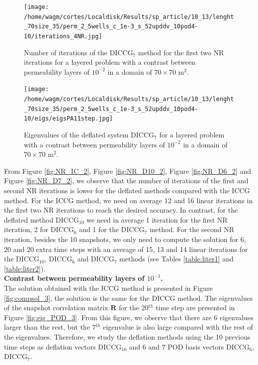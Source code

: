 \documentclass[12pt]{article}
\begin{document}
\begin{figure}[!h]
\centering
\begin{minipage}{.4\textwidth}
\vspace{-0.4cm}
\hspace{-1cm}
\texttt{[image: /home/wagm/cortes/Localdisk/Results/sp\_article/10\_13/lenght\_70size\_35/perm\_2\_5wells\_c\_1e-3\_s\_52upddv\_10pod4-10/iterations\_4NR.jpg]}
\vspace{-1.3cm}
\caption{Number of iterations of the DICCG$_7$ method for the first two NR iterations for a layered problem with a contrast between permeability layers of $10^{-2}$ in a domain of $70 \times 70$ m$^2$.}
\label{fig:NR_D7_2}
\end{minipage}%
\hspace{15mm}
\begin{minipage}{.4\textwidth}
 \centering
\texttt{[image: /home/wagm/cortes/Localdisk/Results/sp\_article/10\_13/lenght\_70size\_35/perm\_2\_5wells\_c\_1e-3\_s\_52upddv\_10pod4-10/eigs/eigsPA11step.jpg]}
\caption{Eigenvalues of the deflated system DICCG$_7$ for a layered problem with a contrast between permeability layers of $10^{-2}$ in a domain of $70 \times 70$ m$^2$.}
\label{fig:eigs_PA7_2}
\end{minipage}
\end{figure}
\newpage

From Figure \ref{fig:NR_IC_2},  Figure \ref{fig:NR_D10_2}, Figure \ref{fig:NR_D6_2} and Figure \ref{fig:NR_D7_2}, we observe that the number of iterations of the first and second NR iterations is lower for the deflated methods compared with the ICCG method. For the ICCG method, we need on average 12 and 16 linear iterations in the first two NR iterations to reach the desired accuracy. In contrast, for the deflated method DICCG$_{10}$ we need in average 1 iteration for the first NR iteration, 2 for DICCG$_6$ and 1 for the DICCG$_7$ method. For the second NR iteration, besides the 10 snapshots, we only need to compute the solution for 6, 20 and 20 extra time steps with an average of 15, 13 and 14 linear iterations for the DICCG$_{10}$, DICCG$_6$ and DICCG$_7$ methods (see Tables \ref{table:liter1} and \ref{table:liter2}). \\

\newpage
\textbf{Contrast between permeability layers of $10^{-3}$.}\\
The solution obtained with the ICCG method is presented in Figure \ref{fig:compsol_3}, the solution is the same for the DICCG method. The eigenvalues of the snapshot correlation matrix $\mathbf{R}$ for the 20$^{th}$ time step are presented in Figure \ref{fig:eig_POD_3}. From this figure, we observe that there are 6 eigenvalues larger than the rest, but the 7$^{th}$ eigenvalue is also large compared with the rest of the eigenvalues. Therefore, we study the deflation methods using the 10 previous time steps as deflation vectors DICCG$_{10}$ and 6 and 7 POD basis vectors DICCG$_6$, DICCG$_7$.    
\end{document}
